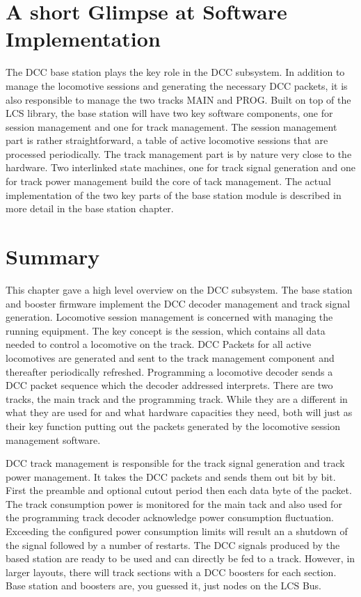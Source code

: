 \section{A short Glimpse at Software Implementation}

The DCC base station plays the key role in the DCC subsystem. In addition to manage the locomotive sessions and generating the necessary DCC packets, it is also responsible to manage the two tracks MAIN and PROG. Built on top of the LCS library, the base station will have two key software components, one for session management and one for track management. The session management part is rather straightforward, a table of active locomotive sessions that are processed periodically. The track management part is by nature very close to the hardware. Two interlinked state machines, one for track signal generation and one for track power management build the core of tack management. The actual implementation of the two key parts of the base station module is described in more detail in the base station chapter.

\section{Summary}

This chapter gave a high level overview on the DCC subsystem. The base station and booster firmware implement the DCC decoder management and track signal generation. Locomotive session management is concerned with managing the running equipment. The key concept is the session, which contains all data needed to control a locomotive on the track. DCC Packets for all active locomotives are generated and sent to the track management component and thereafter periodically refreshed. Programming a locomotive decoder sends a DCC packet sequence which the decoder addressed interprets. There are two tracks, the main track and the programming track. While they are a different in what they are used for and what hardware capacities they need, both will just as their key function putting out the packets generated by the locomotive session management software.

DCC track management is responsible for the track signal generation and track power management. It takes the DCC packets and sends them out bit by bit. First the preamble and optional cutout period then each data byte of the packet. The track consumption power is monitored for the main tack and also used for the programming track decoder acknowledge power consumption fluctuation. Exceeding the configured power consumption limits will result an a shutdown of the signal followed by a number of restarts. The DCC signals produced by the based station are ready to be used and can directly be fed to a track. However, in larger layouts, there will track sections with a DCC boosters for each section. Base station and boosters are, you guessed it, just nodes on the LCS Bus.

